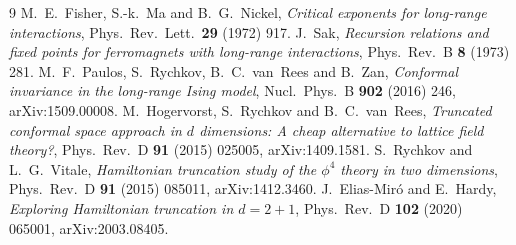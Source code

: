 









\appendix





\begin{thebibliography}{9}
 M.~E.~Fisher, S.-k.~Ma and B.~G.~Nickel, \emph{Critical exponents for long-range interactions}, Phys.\ Rev.\ Lett.\ \textbf{29} (1972) 917.
 J.~Sak, \emph{Recursion relations and fixed points for ferromagnets with long-range interactions}, Phys.\ Rev.\ B \textbf{8} (1973) 281.
 M.~F.~Paulos, S.~Rychkov, B.~C.~van~Rees and B.~Zan, \emph{Conformal invariance in the long-range Ising model}, Nucl.\ Phys.\ B \textbf{902} (2016) 246, arXiv:1509.00008.
 M.~Hogervorst, S.~Rychkov and B.~C.~van~Rees, \emph{Truncated conformal space approach in $d$ dimensions: A cheap alternative to lattice field theory?}, Phys.\ Rev.\ D \textbf{91} (2015) 025005, arXiv:1409.1581.
 S.~Rychkov and L.~G.~Vitale, \emph{Hamiltonian truncation study of the $\phi^4$ theory in two dimensions}, Phys.\ Rev.\ D \textbf{91} (2015) 085011, arXiv:1412.3460.
 J.~Elias-Mir\'o and E.~Hardy, \emph{Exploring Hamiltonian truncation in $d=2+1$}, Phys.\ Rev.\ D \textbf{102} (2020) 065001, arXiv:2003.08405.
\end{thebibliography}
